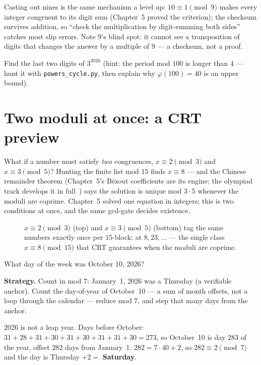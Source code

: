 Casting out nines is the same mechanism a level up: $10 \equiv 1 \pmod 9$
makes every integer congruent to its digit sum (Chapter~5 proved the
criterion); the checksum survives addition, so ``check the multiplication
by digit-summing both sides'' catches most slip errors. Note $9$'s blind
spot: it cannot see a transposition of digits that changes the answer by a
multiple of $9$ --- a checksum, not a proof.

\begin{exercise}[medium]\label{exr:cycle}
Find the last two digits of $3^{2026}$ (hint: the period mod $100$ is
longer than $4$ --- hunt it with \texttt{powers\_cycle.py}, then explain
why $\varphi(100) = 40$ is an upper bound).
\end{exercise}

\section{Two moduli at once: a CRT preview}\label{sec:crt}

What if a number must satisfy \emph{two} congruences, $x \equiv 2 \pmod 3$
and $x \equiv 3 \pmod 5$? Hunting the finite list mod $15$ finds $x \equiv
8$ --- and the Chinese remainder theorem (Chapter~5's B\'ezout coefficients
are its engine; the olympiad track develops it in full~\cite{zhao}) says the
solution is unique mod $3\cdot5$ whenever the moduli are coprime. Chapter~5
solved one equation in integers; this is two conditions at once, and the
same gcd-gate decides existence.

\begin{figure}[ht]\centering

\caption{$x \equiv 2 \pmod 3$ (top) and $x \equiv 3 \pmod 5$ (bottom) tag
the same numbers exactly once per $15$-block: at $8, 23, \dots$ --- the
single class $x \equiv 8 \pmod{15}$ that CRT guarantees when the moduli
are coprime.}
\label{fig:crtsunzi}
\end{figure}

\begin{example}\label{ex:calendar}
What day of the week was October 10, 2026?
\par\smallskip
\textbf{Strategy.} Count in mod $7$: January~1, 2026 was a Thursday (a
verifiable anchor). Count the day-of-year of October~10 --- a sum of month
offsets, not a loop through the calendar --- reduce mod $7$, and step that
many days from the anchor.
\par\smallskip
\begin{solution}
2026 is not a leap year. Days before October:
$31+28+31+30+31+30+31+31+30 = 273$, so October~10 is day $283$ of the year,
offset $282$ days from January~1. $282 = 7\cdot40 + 2$, so
$282 \equiv 2 \pmod 7$ and the day is Thursday $+ 2 =$
\textbf{Saturday}.
\end{solution}
\end{example}

